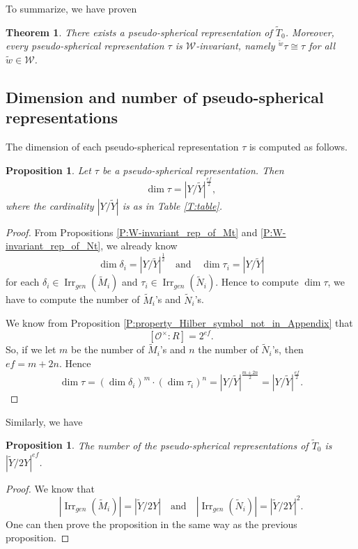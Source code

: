 \documentclass[10pt, letterpaper]{amsart}
\theoremstyle{plain}
\newtheorem{Thm}[equation]{Theorem}
\newtheorem{Prop}[equation]{Proposition}
\theoremstyle{definition}
\numberwithin{equation}{section}
\newcommand{\wt}{\tilde{w}}
\newcommand{\Mt}{\widetilde{M}}
\newcommand{\Nt}{\widetilde{N}}
\newcommand{\Tt}{\widetilde{T}}
\newcommand{\Yt}{\widetilde{Y}}
\newcommand{\Irr}{\operatorname{Irr}}
\newcommand{\Ocal}{\mathcal{O}}
\newcommand{\Wcal}{\mathcal{W}}
\newcommand{\qand}{{\quad\text{and}\quad}}
\begin{document}
To summarize, we have proven
\begin{Thm}\label{T:PseudoT0}
There exists a pseudo-spherical representation of $\Tt_{0}$. Moreover, every pseudo-spherical representation $\tau$ is $\Wcal$-invariant, namely ${^{\wt}\tau}\cong\tau$ for all $\wt\in\Wcal$.
\end{Thm}



\subsection{Dimension and number of pseudo-spherical representations}


The dimension of each pseudo-spherical representation $\tau$ is computed as follows.
\begin{Prop}
Let $\tau$ be a pseudo-spherical representation. Then
\[
\dim\tau=\left|Y\slash \Yt\right|^{\frac{ef}{2}},
\]
where the cardinality $\left|Y\slash \Yt\right|$ is as in Table \ref{T:table}.
\end{Prop}
\begin{proof}
From Propositions \ref{P:W-invariant_rep_of_Mt} and \ref{P:W-invariant_rep_of_Nt}, we already know
\[
\dim\delta_i=\left|Y\slash \Yt\right|^{\frac{1}{2}}\qand \dim\tau_i=\left|Y\slash \Yt\right|
\]
for each $\delta_i\in\Irr_{gen}(\Mt_i)$ and $\tau_i\in\Irr_{gen}(\Nt_i)$. Hence to compute $\dim\tau$, we have to compute the number of $\Mt_i$'s and $\Nt_i$'s.

We know from Proposition \ref{P:property_Hilber_symbol_not_in_Appendix} that
\[
[\Ocal^{\times}: R]=2^{ef}.
\]
So, if we let $m$ be the number of $\Mt_i$'s and $n$ the number of $\Nt_i$'s, then $ef=m+2n$. Hence 
\[
\dim\tau=(\dim\delta_i)^{m}\cdot(\dim\tau_i)^n=\left|Y\slash \Yt\right|^{\frac{m+2n}{2}}=\left|Y\slash \Yt\right|^{\frac{ef}{2}}.
\]
\end{proof}

Similarly, we have
\begin{Prop}
The number of the pseudo-spherical representations of $\Tt_{0}$ is $\left|\Yt\slash 2Y\right|^{ef}$.
\end{Prop}
\begin{proof}
We know that 
\[
\left|\Irr_{gen}(\Mt_i)\right|=\left|\Yt\slash 2Y\right|\qand \left|\Irr_{gen}(\Nt_i)\right|=\left|\Yt\slash 2Y\right|^2.
\]
One can then prove the proposition in the same way as the previous proposition.
\end{proof}
\end{document}
